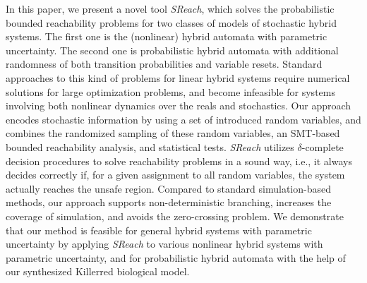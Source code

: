 In this paper, we present a novel tool {\it SReach}, which solves the probabilistic bounded reachability problems for two classes of models of stochastic hybrid systems. The first one is the (nonlinear) hybrid automata with parametric uncertainty. The second one is probabilistic hybrid automata with additional randomness of both transition probabilities and variable resets. Standard approaches to this kind of problems for linear hybrid systems require numerical solutions for large optimization problems, and become infeasible for systems involving both nonlinear dynamics over the reals and stochastics. Our approach encodes stochastic information by using a set of introduced random variables, and combines the randomized sampling of these random variables, an SMT-based bounded reachability analysis, 
and statistical tests. {\it SReach} utilizes $\delta$-complete decision procedures 
to solve reachability problems in a sound way, i.e., it always decides correctly if, for a given
assignment to all random variables, the system actually reaches the unsafe region.
Compared to standard simulation-based methods, our approach supports 
non-deterministic branching, increases the coverage of simulation, and avoids the
zero-crossing problem. We demonstrate that our method is feasible for general
hybrid systems with parametric uncertainty by applying {\it SReach} to
various nonlinear hybrid systems with parametric uncertainty, and for probabilistic hybrid automata with the help of our synthesized  Killerred biological model.